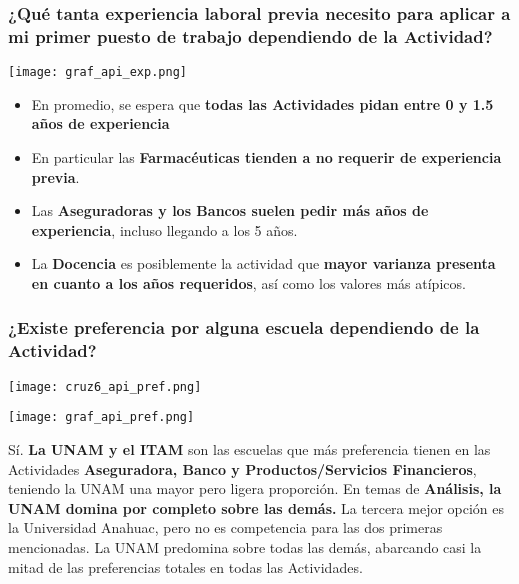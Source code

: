 \documentclass{article}
\begin{document}
\subsubsection{¿Qué tanta experiencia laboral previa necesito para aplicar a mi primer puesto de trabajo dependiendo de la Actividad?}

\begin{center}
    \texttt{[image: graf\_api\_exp.png]}
\end{center}

\begin{itemize}
    \item En promedio, se espera que \textbf{todas las Actividades pidan entre 0 y 1.5 años de experiencia}

    \item En particular las \textbf{Farmacéuticas tienden a no requerir de experiencia previa}.
    
    \item Las \textbf{Aseguradoras y los Bancos suelen pedir más años de experiencia}, incluso llegando a los 5 años. 
    
    \item La \textbf{Docencia} es posiblemente la actividad que \textbf{mayor varianza presenta en cuanto a los años requeridos}, así como los valores más atípicos.
\end{itemize}


\subsubsection{¿Existe preferencia por alguna escuela dependiendo de la Actividad?}

\begin{center}
    \texttt{[image: cruz6\_api\_pref.png]}
\end{center}

\begin{center}
    \texttt{[image: graf\_api\_pref.png]}
\end{center}

Sí. \textbf{La UNAM y el ITAM} son las escuelas que más preferencia tienen en las Actividades \textbf{Aseguradora, Banco y Productos/Servicios Financieros}, teniendo la UNAM una mayor pero ligera proporción. En temas de \textbf{Análisis, la UNAM domina por completo sobre las demás.} La tercera mejor opción es la Universidad Anahuac, pero no es competencia para las dos primeras mencionadas. La UNAM predomina sobre todas las demás, abarcando casi la mitad de las preferencias totales en todas las Actividades. 
\end{document}
